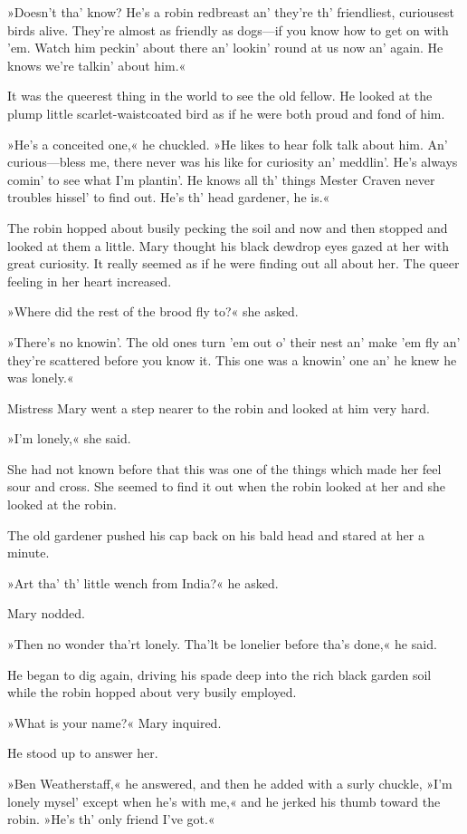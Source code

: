 »Doesn't tha' know? He's a robin redbreast an' they're th' friendliest, curiousest birds alive. They're almost as friendly as dogs—if you know how to get on with 'em. Watch him peckin' about there an' lookin' round at us now an' again. He knows we're talkin' about him.«

It was the queerest thing in the world to see the old fellow. He looked at the plump little scarlet-waistcoated bird as if he were both proud and fond of him.

»He's a conceited one,« he chuckled. »He likes to hear folk talk about him. An' curious—bless me, there never was his like for curiosity an' meddlin'. He's always comin' to see what I'm plantin'. He knows all th' things Mester Craven never troubles hissel' to find out. He's th' head gardener, he is.«

The robin hopped about busily pecking the soil and now and then stopped and looked at them a little. Mary thought his black dewdrop eyes gazed at her with great curiosity. It really seemed as if he were finding out all about her. The queer feeling in her heart increased.

»Where did the rest of the brood fly to?« she asked.

»There's no knowin'. The old ones turn 'em out o' their nest an' make 'em fly an' they're scattered before you know it. This one was a knowin' one an' he knew he was lonely.«

Mistress Mary went a step nearer to the robin and looked at him very hard.

»I'm lonely,« she said.

She had not known before that this was one of the things which made her feel sour and cross. She seemed to find it out when the robin looked at her and she looked at the robin.

The old gardener pushed his cap back on his bald head and stared at her a minute.

»Art tha' th' little wench from India?« he asked.

Mary nodded.

»Then no wonder tha'rt lonely. Tha'lt be lonelier before tha's done,« he said.

He began to dig again, driving his spade deep into the rich black garden soil while the robin hopped about very busily employed.

»What is your name?« Mary inquired.

He stood up to answer her.

»Ben Weatherstaff,« he answered, and then he added with a surly chuckle, »I'm lonely mysel' except when he's with me,« and he jerked his thumb toward the robin. »He's th' only friend I've got.«

